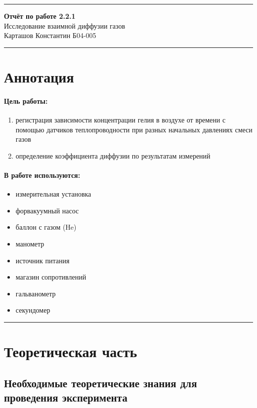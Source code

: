 \documentclass[a4paper,12pt]{article} %
\begin{document}
\hrule 	
\medskip
\begin{raggedright}
{\large \textbf{Отчёт по работе 2.2.1}}
\\
\medskip
{\Large Исследование взаимной диффузии газов} 
\\
\medskip
{\large Карташов Константин Б04-005}
\medskip
\hrule
\medskip
\end{raggedright}


\section{Аннотация}


\paragraph{Цель работы:} 
\begin{enumerate}
\itemsep0em
\item регистрация зависимости концентрации гелия в воздухе от времени с помощью датчиков теплопроводности при разных начальных давлениях смеси газов
\item определение коэффициента диффузии по результатам измерений
\end{enumerate}

\paragraph{В работе используются:}
\begin{itemize}
\itemsep0em
\renewcommand{\labelitemi}{$\triangleright$}
\item измерительная установка
\item форвакуумный насос 
\item баллон с газом (He)
\item манометр
\item источник питания
\item магазин сопротивлений 
\item гальванометр
\item секундомер
\end{itemize}



\medskip\hrule\medskip

\section{Теоретическая часть}

\subsection{Необходимые теоретические знания для проведения эксперимента}
\end{document}
